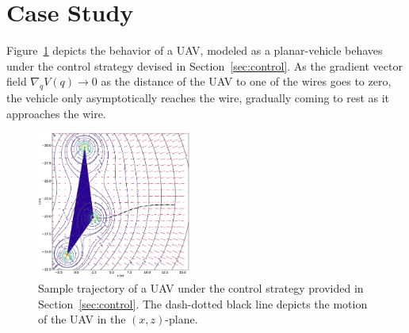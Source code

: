 \section{Case Study}
\label{sec:simulation}

Figure~\ref{fig:simulation} depicts the behavior of a UAV, modeled as a
planar-vehicle behaves under the control strategy devised in
Section~\ref{sec:control}. As the gradient vector field $\nabla_qV(q) \rightarrow
0$ as the distance of the UAV to one of the wires goes to zero, the vehicle only
asymptotically reaches the wire, gradually coming to rest as it approaches the
wire.
%
\begin{figure}[tbh]
  \centering
  \includegraphics[width=0.45\textwidth]{./figures/simtraj.eps}
  \caption{Sample trajectory of a UAV under the control strategy provided in
  Section~\ref{sec:control}. The dash-dotted black line depicts the motion of
    the UAV in the $(x,z)$-plane.}
  \label{fig:simulation}
\end{figure}
%
